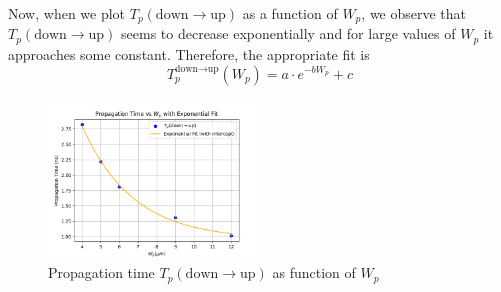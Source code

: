 \documentclass[../main.tex]{subfiles}
\begin{document}
{{			Now, when we plot $T_p(\text{down} \to \text{up})$ as a function of $W_p$, we observe that $T_p(\text{down} \to \text{up})$ seems to decrease exponentially and for large values of $W_p$ it approaches some constant. Therefore, the appropriate fit is
			$$T_p^{\text{down} \to \text{up}}(W_p) = a\cdot e^{-bW_p} + c$$
			
			\begin{figure}[H]
				\centering
				\includegraphics[width=0.5\textwidth]{plots/Q7_Wp_plot.png}
				\caption{Propagation time $T_p(\text{down} \to \text{up})$ as function of $W_p$}
			\end{figure}
			
		}
		
	}
\end{document}
